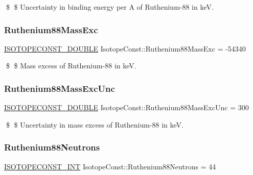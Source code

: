 \$ \$ Uncertainty in binding energy per A of Ruthenium-\/88 in keV. \mbox{\label{group___isotope_const-_ruthenium-_ru88_gad25c0ff8fa58ad6629f7ade4a6bb089f}} 
\subsubsection{\texorpdfstring{Ruthenium88\+Mass\+Exc}{Ruthenium88MassExc}}
{\footnotesize\ttfamily \mbox{\hyperlink{group___isotope_const-_macros_ga8f45a7272ce02c0b4c65c44636ed719a}{I\+S\+O\+T\+O\+P\+E\+C\+O\+N\+S\+T\+\_\+\+D\+O\+U\+B\+LE}} Isotope\+Const\+::\+Ruthenium88\+Mass\+Exc = -\/54340}

\$ \$ Mass excess of Ruthenium-\/88 in keV. \mbox{\label{group___isotope_const-_ruthenium-_ru88_gae9dd1642c2a48bbcf8a94572db25c9a7}} 
\subsubsection{\texorpdfstring{Ruthenium88\+Mass\+Exc\+Unc}{Ruthenium88MassExcUnc}}
{\footnotesize\ttfamily \mbox{\hyperlink{group___isotope_const-_macros_ga8f45a7272ce02c0b4c65c44636ed719a}{I\+S\+O\+T\+O\+P\+E\+C\+O\+N\+S\+T\+\_\+\+D\+O\+U\+B\+LE}} Isotope\+Const\+::\+Ruthenium88\+Mass\+Exc\+Unc = 300}

\$ \$ Uncertainty in mass excess of Ruthenium-\/88 in keV. \mbox{\label{group___isotope_const-_ruthenium-_ru88_ga0ceccd75dda897fb84d4cb03997ec12b}} 
\subsubsection{\texorpdfstring{Ruthenium88\+Neutrons}{Ruthenium88Neutrons}}
{\footnotesize\ttfamily \mbox{\hyperlink{group___isotope_const-_macros_ga5f18360b3e99483a35c32d789e62621c}{I\+S\+O\+T\+O\+P\+E\+C\+O\+N\+S\+T\+\_\+\+I\+NT}} Isotope\+Const\+::\+Ruthenium88\+Neutrons = 44}

